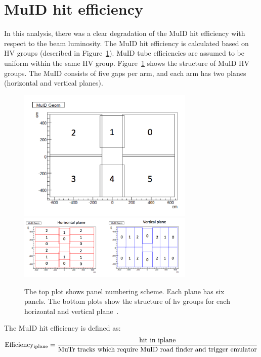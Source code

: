 \section{MuID hit efficiency}
In this analysis, there was a clear degradation of the MuID hit efficiency with
respect to the beam luminosity. The MuID hit efficiency is calculated based on
HV groups (described in Figure~\ref{Fig:efficiency:MuidEff:hvgroup}). MuID tube
efficiencies are assumed to be uniform within the same HV group.
Figure~\ref{Fig:efficiency:MuidEff:hvgroup} shows the structure of MuID HV
groups. The MuID consists of five gaps per arm, and each arm has two planes
(horizontal and vertical planes).

\begin{figure}[ht]
  \centering
  \includegraphics[width=0.75\textwidth]{./figures/muid_panel_structure.pdf}
  \includegraphics[width=0.75\textwidth]{./figures/muid_hv_group.pdf}
  \caption{
    The top plot shows panel numbering scheme. Each plane has six panels. The
    bottom plots show the structure of hv groups for each horizontal and
    vertical plane~\cite{Seidl2014}.
  }
  \label{Fig:efficiency:MuidEff:hvgroup}
\end{figure}

{\noindent}The MuID hit efficiency is defined as:
\begin{equation}
{\rm Efficiency_{iplane}}=\frac{\rm hit~in~iplane}{\rm MuTr~tracks~which~require~MuID~road~finder~and~trigger~emulator}
\end{equation}

